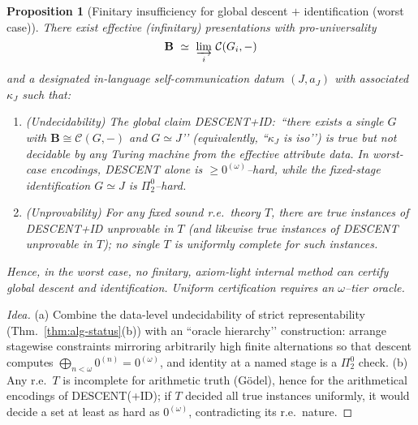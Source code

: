 \documentclass[11pt]{article}
\theoremstyle{upright}
\newtheorem{proposition}{Proposition}
\begin{document}
\begin{proposition}[Finitary insufficiency for global descent $+$ identification (worst case)]
There exist effective (infinitary) presentations with pro-universality
\[
\mathbf B\ \simeq\ \varinjlim_{i}\,\mathcal C(G_i,-)
\]
and a designated in-language self-communication datum $(J,a_J)$ with associated $\kappa_J$ such that:
\begin{enumerate}[leftmargin=2em,label=(\alph*)]
\item (\emph{Undecidability}) The global claim \textsf{DESCENT+ID}:\ “there exists a single $G$ with $\mathbf B\cong\mathcal C(G,-)$ and $G\simeq J$’’ (equivalently, “$\kappa_J$ is iso’’) is true but not decidable by any Turing machine from the effective attribute data. In worst-case encodings, \textsf{DESCENT} alone is $\ge 0^{(\omega)}$–hard, while the fixed-stage identification $G\simeq J$ is $\Pi^0_2$–hard.
\item (\emph{Unprovability}) For any fixed sound r.e.\ theory $T$, there are true instances of \textsf{DESCENT+ID} unprovable in $T$ (and likewise true instances of \textsf{DESCENT} unprovable in $T$); no single $T$ is uniformly complete for such instances.
\end{enumerate}
Hence, in the worst case, no finitary, axiom-light internal method can certify global descent and identification. Uniform certification requires an $\omega$–tier oracle.
\end{proposition}

\begin{proof}[Idea]
(a) Combine the data-level undecidability of strict representability (Thm.~\ref{thm:alg-status}(b)) with an “oracle hierarchy’’ construction: arrange stagewise constraints mirroring arbitrarily high finite alternations so that descent computes $\bigoplus_{n<\omega}0^{(n)}=0^{(\omega)}$, and identity at a named stage is a $\Pi^0_2$ check. 
(b) Any r.e.\ $T$ is incomplete for arithmetic truth (Gödel), hence for the arithmetical encodings of \textsf{DESCENT(+ID)}; if $T$ decided all true instances uniformly, it would decide a set at least as hard as $0^{(\omega)}$, contradicting its r.e.\ nature.
\end{proof}
\end{document}
